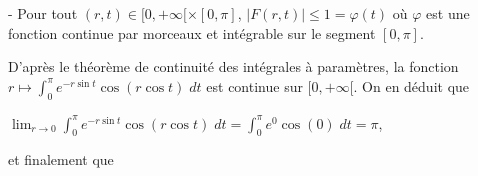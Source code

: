 {\begin{enumerate}
{- Pour tout $(r,t)\in[0,+\infty[\times[0,\pi]$, $|F(r,t)|\leqslant1=\varphi(t)$ où $\varphi$ est une fonction continue par morceaux et intégrable sur le segment $[0,\pi]$.

D'après le théorème de continuité des intégrales à paramètres, la fonction $r\mapsto\int_{0}^{\pi}e^{-r\sin t}\cos(r\cos t)\;dt$ est continue sur $[0,+\infty[$. On en déduit que

\begin{center}
$\lim_{r \rightarrow 0}\int_{0}^{\pi}e^{-r\sin t}\cos(r\cos t)\;dt=\int_{0}^{\pi}e^0\cos(0)\;dt=\pi$,
\end{center}

et finalement que

\begin{center}
\end{center}}
\end{enumerate}
}
